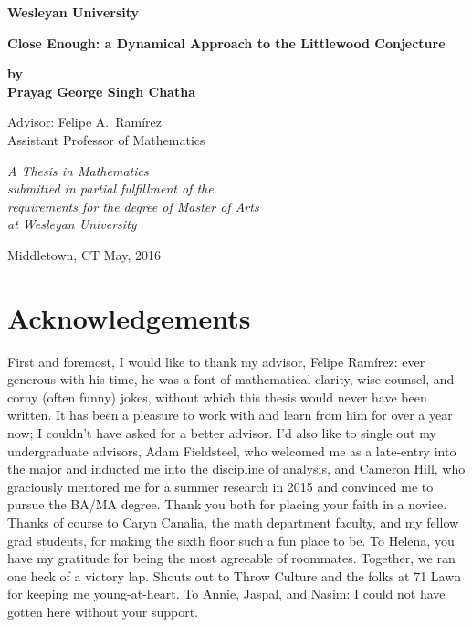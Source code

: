 \documentclass[12pt, letterpaper, oneside]{book}
\theoremstyle{plain}
\theoremstyle{definition}
\theoremstyle{remark}
\begin{document}
\frontmatter
\begin{titlepage}
  \begin{center}

   {\Large \textbf{Wesleyan University}}

    \vspace{1cm}

    {\Huge \textbf{Close Enough: a Dynamical Approach to the Littlewood Conjecture}}

    \vspace{1cm}
    

{\large \textbf{by\\
    Prayag George Singh Chatha}
}
    \vspace{1cm}

   


{\large Advisor: Felipe A.~Ram{\'i}rez\\
    Assistant Professor of Mathematics}

    \vspace{1cm}
    
    \begin{singlespace}
    {\emph{A Thesis in Mathematics\\
    submitted in partial fulfillment of the\\
    requirements for the degree of Master of Arts\\
    at Wesleyan University}}
    \end{singlespace}
    \vspace{1cm}

      Middletown, CT \hfill      May, 2016
  \end{center}
\end{titlepage}


\chapter*{Acknowledgements}

First and foremost, I would like to thank my advisor, Felipe Ram{\'i}rez: ever generous with his time, he was a font of mathematical clarity, wise counsel, and corny (often funny) jokes, without which this thesis would never have been written. It has been a pleasure to work with and learn from him for over a year now; I couldn't have asked for a better advisor. I'd also like to single out my undergraduate advisors, Adam Fieldsteel, who welcomed me as a late-entry into the major and inducted me into the discipline of analysis, and Cameron Hill, who graciously mentored me for a summer research in 2015 and convinced me to pursue the BA/MA degree. Thank you both for placing your faith in a novice. Thanks of course to Caryn Canalia, the math department faculty, and my fellow grad students, for making the sixth floor such a fun place to be. 
To Helena, you have my gratitude for being the most agreeable of roommates. Together, we ran one heck of a victory lap. Shouts out to Throw Culture and the folks at 71 Lawn for keeping me young-at-heart. To Annie, Jaspal, and Nasim: I could not have gotten here without your support. 
\end{document}
